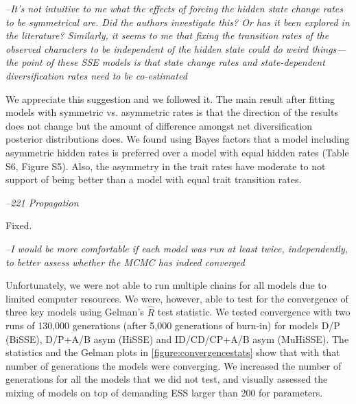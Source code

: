 \documentclass[11pt]{article}
\renewenvironment{quote}{\bigskip\noindent\itshape\ignorespaces}{\smallskip}
\begin{document}
\begin{quote}
--It's not intuitive to me what the effects of forcing the hidden state change rates to be symmetrical are.
Did the authors investigate this?
Or has it been explored in the literature?
Similarly, it seems to me that fixing the transition rates of the observed characters to be independent of the hidden state could do weird things---the point of these SSE models is that state change rates and state-dependent diversification rates need to be co-estimated
\end{quote}

We appreciate this suggestion and we followed it. The main result after fitting models with symmetric vs. asymmetric rates is that the direction of the results does not change but the amount of difference amongst net diversification posterior distributions does. 
We found using Bayes factors that a model including asymmetric hidden rates is preferred over a model with equal hidden rates (Table S6, Figure S5). 
Also,  the asymmetry in the trait rates have moderate to not support of being better than a model with equal trait transition rates.  


\begin{quote}
--221  Propagation
\end{quote}

Fixed.


\begin{quote}
--I would be more comfortable if each model was run at least twice, independently, to better assess whether the MCMC has indeed converged
\end{quote}

Unfortunately, we were not able to run multiple chains for all models due to limited computer resources. 
We were, however, able to test for the convergence of  three key models using Gelman's $\hat{R}$ test statistic. 
We tested convergence with two runs of 130,000 generations (after 5,000 generations of burn-in) for models D/P (BiSSE), D/P+A/B asym (HiSSE) and ID/CD/CP+A/B asym (MuHiSSE). 
The statistics and the Gelman plots in  \ref{figure:convergencestats} show that with that number of generations the models were converging. 
We increased the number of generations for all the models that we did not test, and visually assessed the mixing of models on top of demanding ESS larger than 200 for parameters. 
\end{document}
